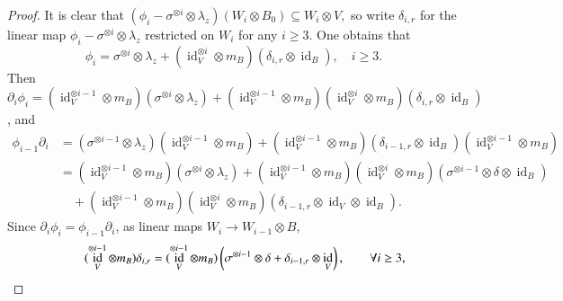 \documentclass[a4paper,10pt]{amsart}
\theoremstyle{definition}
\numberwithin{equation}{section}
\DeclareMathOperator{\id}{id}
\begin{document}
\begin{proof}
It is clear that
$(\phi_i-\sigma^{\otimes i}\otimes\lambda_z)(W_i\otimes B_0)\subseteq W_i\otimes V,$ so write $\delta_{i,r}$ for the linear map $\phi_i-\sigma^{\otimes i}\otimes\lambda_z$ restricted on $W_i$ for any $i\geq 3$. One obtains that
$$
\phi_i=\sigma^{\otimes i}\otimes \lambda_z+(\id_V^{\otimes i}\otimes m_B)(\delta_{i,r}\otimes\id_B),\quad i\geq 3.
$$
Then $\partial_i\phi_i=(\id_V^{\otimes i-1}\otimes m_B)(\sigma^{\otimes i}\otimes\lambda_z)+(\id_V^{\otimes i-1}\otimes m_B)(\id_V^{\otimes i}\otimes m_B)(\delta_{i,r}\otimes \id_B)$, and
\begin{align*}
\phi_{i-1}\partial_i&=(\sigma^{\otimes i-1}\otimes \lambda_z)(\id_V^{\otimes i-1}\otimes m_B)
+(\id_V^{\otimes i-1}\otimes m_B)\left(\delta_{i-1,r}\otimes\id_B\right)(\id_V^{\otimes i-1}\otimes m_B)\\
&=(\id_V^{\otimes i-1}\otimes m_B)(\sigma^{\otimes i}\otimes\lambda_z)+
(\id^{\otimes i-1}_V\otimes m_B)(\id^{\otimes i}_V\otimes m_B)(\sigma^{\otimes i-1}\otimes\delta\otimes\id_B)\\
&\quad +(\id^{\otimes i-1}_V\otimes m_B)(\id^{\otimes i}_V\otimes m_B)(\delta_{i-1,r}\otimes\id_V\otimes\id_B).
\end{align*}
Since $\partial_i\phi_{i}=\phi_{i-1}\partial_i$, as linear maps $W_i\to W_{i-1}\otimes B$,
\begin{equation*}
\qquad(\id_V^{\otimes i-1}\otimes m_B)\delta_{i,r}=(\id_V^{\otimes i-1}\otimes m_B)\left(\sigma^{\otimes i-1}\otimes\delta+\delta_{i-1,r}\otimes \id_V\right),\qquad \forall i\geq 3,\qedhere
\end{equation*}
%
%
%

\end{proof}
\end{document}
